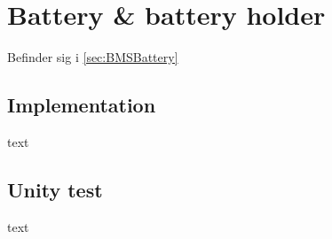 \section{Battery \& battery holder}
Befinder sig i \ref{sec:BMSBattery}

\subsection{Implementation}
text

\subsection{Unity test}
text